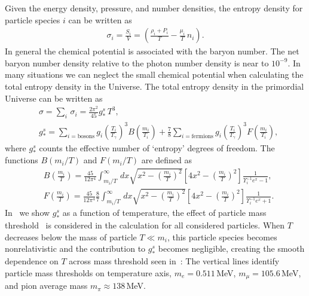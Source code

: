 Given the energy density, pressure, and number densities, the entropy density for particle species $i$ can be written as 
\begin{align}\label{entropy}
\sigma_i=\frac{S_i}{V}=\left(\frac{\rho_i+P_i}{T}-\frac{\mu_i}{T}\,n_i\right).
\end{align}
In general the chemical potential is associated with the baryon number. The net baryon number density relative to the photon number density is near to $10^{-9}$. In many situations we can neglect the small chemical potential when calculating the total entropy density in the Universe. The total entropy density in the primordial Universe can be written as
\begin{align}
&\sigma=\sum_i\,\sigma_i=\frac{2\pi^2}{45}g^s_\ast\,T^3,\\
&g^s_\ast=\sum_{i=\mathrm{bosons}}g_i\left({\frac{T_i}{T_\gamma}}\right)^3B\left(\frac{m_i}{T_i}\right)+\frac{7}{8}\sum_{i=\mathrm{fermions}}g_i\left({\frac{T_i}{T_\gamma}}\right)^3F\left(\frac{m_i}{T_i}\right),
\end{align}
where $g^s_\ast$ counts the effective number of `entropy' degrees of freedom. The functions $B(m_i/T)$ and $F(m_i/T)$ are defined as 
\begin{align}
&B\left(\frac{m_i}{T}\right)=\frac{45}{12\pi^4}\int^\infty_{m_i/T}\,dx\sqrt{x^2-\left(\frac{m_i}{T}\right)^2}\left[4x^2-\left(\frac{m_i}{T}\right)^2\right]\frac{1}{\Upsilon^{-1}_ie^x-1},\\
&F\left(\frac{m_i}{T}\right)=\frac{45}{12\pi^4}\frac{8}{7}\int^\infty_{m_i/T}\,dx\sqrt{x^2-\left(\frac{m_i}{T}\right)^2}\left[4x^2-\left(\frac{m_i}{T}\right)^2\right]\frac{1}{\Upsilon^{-1}_ie^x+1}.
\end{align}
In~ we show $g^s_\ast$ as a function of temperature, the effect of particle mass threshold~\cite{Coc:2006rt} is considered in the calculation for all considered particles. When $T$ decreases below the mass of particle $T\ll m_i$, this particle species becomes nonrelativistic and the contribution to $g^s_\ast$ becomes negligible, creating the smooth dependence on $T$ across mass threshold seen in~: The vertical lines identify particle mass thresholds on temperature axis, $m_e=0.511$\,MeV, $m_\mu=105.6$\,MeV, and pion average mass $m_\pi\approx138$\,MeV.

